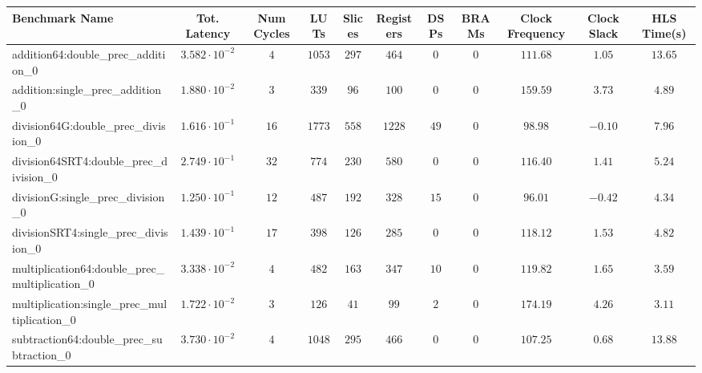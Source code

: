 \begin{tabular}{|l|c|c|c|c|c|c|c|c|c|c|}
\hline
Benchmark Name                                   & Tot. Latency            & Num Cycles & LUTs     & Slices   & Registers & DSPs   & BRAMs & Clock Frequency & Clock Slack & HLS Time(s) \\
\hline
addition64:double\_prec\_addition\_0             & $ 3.582 \cdot 10^{-2} $ & $ 4      $ & $ 1053 $ & $ 297  $ & $ 464   $ & $ 0  $ & $ 0 $ & $ 111.68      $ & $ 1.05    $ & $ 13.65   $ \\
addition:single\_prec\_addition\_0               & $ 1.880 \cdot 10^{-2} $ & $ 3      $ & $ 339  $ & $ 96   $ & $ 100   $ & $ 0  $ & $ 0 $ & $ 159.59      $ & $ 3.73    $ & $ 4.89    $ \\
division64G:double\_prec\_division\_0            & $ 1.616 \cdot 10^{-1} $ & $ 16     $ & $ 1773 $ & $ 558  $ & $ 1228  $ & $ 49 $ & $ 0 $ & $ 98.98       $ & $ -0.10   $ & $ 7.96    $ \\
division64SRT4:double\_prec\_division\_0         & $ 2.749 \cdot 10^{-1} $ & $ 32     $ & $ 774  $ & $ 230  $ & $ 580   $ & $ 0  $ & $ 0 $ & $ 116.40      $ & $ 1.41    $ & $ 5.24    $ \\
divisionG:single\_prec\_division\_0              & $ 1.250 \cdot 10^{-1} $ & $ 12     $ & $ 487  $ & $ 192  $ & $ 328   $ & $ 15 $ & $ 0 $ & $ 96.01       $ & $ -0.42   $ & $ 4.34    $ \\
divisionSRT4:single\_prec\_division\_0           & $ 1.439 \cdot 10^{-1} $ & $ 17     $ & $ 398  $ & $ 126  $ & $ 285   $ & $ 0  $ & $ 0 $ & $ 118.12      $ & $ 1.53    $ & $ 4.82    $ \\
multiplication64:double\_prec\_multiplication\_0 & $ 3.338 \cdot 10^{-2} $ & $ 4      $ & $ 482  $ & $ 163  $ & $ 347   $ & $ 10 $ & $ 0 $ & $ 119.82      $ & $ 1.65    $ & $ 3.59    $ \\
multiplication:single\_prec\_multiplication\_0   & $ 1.722 \cdot 10^{-2} $ & $ 3      $ & $ 126  $ & $ 41   $ & $ 99    $ & $ 2  $ & $ 0 $ & $ 174.19      $ & $ 4.26    $ & $ 3.11    $ \\
subtraction64:double\_prec\_subtraction\_0       & $ 3.730 \cdot 10^{-2} $ & $ 4      $ & $ 1048 $ & $ 295  $ & $ 466   $ & $ 0  $ & $ 0 $ & $ 107.25      $ & $ 0.68    $ & $ 13.88   $ \\

\end{tabular}
